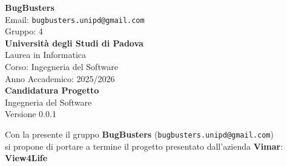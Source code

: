 \documentclass[a4paper,12pt]{article}
\newcommand{\CurrentVersion}{0.0.1} %
\begin{document}
\begin{center}
  
  {\Large\bfseries\color{primaryblue} BugBusters}\\[0.3cm]
  {\small\color{darkgray} Email: \texttt{bugbusters.unipd@gmail.com}} \\[0.1cm]
  {\small\color{darkgray} Gruppo: 4} \\[0.5cm]

  {\large\bfseries Università degli Studi di Padova}\\[0.3cm]
  {\small Laurea in Informatica}\\[0.2cm]
  {\small Corso: Ingegneria del Software}\\[0.2cm]
  {\small Anno Accademico: 2025/2026}\\[0.8cm]

  {\Huge\bfseries\color{primaryblue} Candidatura Progetto}\\[0.3cm]
  {\Large\color{secondaryblue} Ingegneria del Software}\\[0.8cm]
  {\Large\color{secondaryblue} Versione \CurrentVersion}\\[0.8cm]
\end{center}

\begin{center}
\begin{tcolorbox}[colback=secondaryblue!10,colframe=secondaryblue,width=0.9\textwidth,arc=3mm,boxrule=0.8pt]
\centering
Con la presente il gruppo \textbf{BugBusters} (\texttt{bugbusters.unipd@gmail.com}) \\
si propone di portare a termine il progetto presentato dall'azienda \textbf{Vimar}: \\[0.3cm]
{\Large\bfseries\color{primaryblue} View4Life}
\end{tcolorbox}
\end{center}
\end{document}
